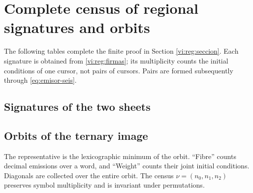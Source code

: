 \section{Complete census of regional signatures and orbits}
\label{vi:reg:tablas}

The following tables complete the finite proof in Section
\ref{vi:reg:seccion}. Each signature is obtained from
\eqref{vi:reg:firmas}; its multiplicity counts the initial
conditions of one cursor, not pairs of cursors. Pairs are
formed subsequently through \eqref{eq:emisor-seis}.

\subsection{Signatures of the two sheets}


\subsection{Orbits of the ternary image}
The representative is the lexicographic minimum of the orbit. “Fibre”
counts decimal emissions over a word, and “Weight” counts their
joint initial conditions. Diagonals are collected over
the entire orbit. The census \(\nu=(n_0,n_1,n_2)\) preserves
symbol multiplicity and is invariant under permutations.


